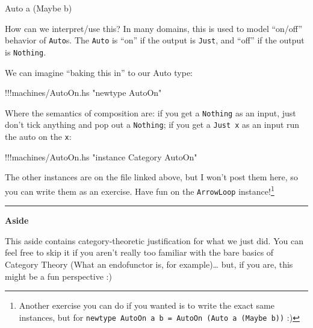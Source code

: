 \documentclass[]{article}
\newenvironment{Shaded}{}{}
\newcommand{\DataTypeTok}[1]{\textcolor[rgb]{0.56,0.13,0.00}{{#1}}}
\newcommand{\StringTok}[1]{\textcolor[rgb]{0.25,0.44,0.63}{{#1}}}
\newcommand{\FunctionTok}[1]{\textcolor[rgb]{0.02,0.16,0.49}{{#1}}}
\newcommand{\NormalTok}[1]{{#1}}
\begin{document}
\begin{Shaded}
\begin{Highlighting}[]
\DataTypeTok{Auto} \NormalTok{a (}\DataTypeTok{Maybe} \NormalTok{b)}
\end{Highlighting}
\end{Shaded}

How can we interpret/use this? In many domains, this is used to model
``on/off'' behavior of \texttt{Auto}s. The \texttt{Auto} is ``on'' if
the output is \texttt{Just}, and ``off'' if the output is
\texttt{Nothing}.

We can imagine ``baking this in'' to our Auto type:

\begin{Shaded}
\begin{Highlighting}[]
\FunctionTok{!!!}\NormalTok{machines}\FunctionTok{/}\NormalTok{AutoOn.hs }\StringTok{"newtype AutoOn"}
\end{Highlighting}
\end{Shaded}

Where the semantics of composition are: if you get a \texttt{Nothing} as
an input, just don't tick anything and pop out a \texttt{Nothing}; if
you get a \texttt{Just\ x} as an input run the auto on the \texttt{x}:

\begin{Shaded}
\begin{Highlighting}[]
\FunctionTok{!!!}\NormalTok{machines}\FunctionTok{/}\NormalTok{AutoOn.hs }\StringTok{"instance Category AutoOn"}
\end{Highlighting}
\end{Shaded}

The other instances are on the file linked above, but I won't post them
here, so you can write them as an exercise. Have fun on the
\texttt{ArrowLoop} instance!\footnote{Another exercise you can do if you
  wanted is to write the exact same instances, but for
  \texttt{newtype\ AutoOn\ a\ b\ =\ AutoOn\ (Auto\ a\ (Maybe\ b))} :)}

\begin{center}\rule{0.5\linewidth}{\linethickness}\end{center}

\textbf{Aside}

This aside contains category-theoretic justification for what we just
did. You can feel free to skip it if you aren't really too familiar with
the bare basics of Category Theory (What an endofunctor is, for
example)\ldots{} but, if you are, this might be a fun perspective :)
\end{document}
